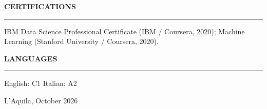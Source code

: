 \documentclass[10pt,a4paper]{article}
\newcommand{\cvsec}[1]{%
  \needspace{5\baselineskip}%
  \vspace{3pt}
  {\color{accent}\bfseries\uppercase{#1}}\\[-3pt]
  {\color{accent}\rule{\linewidth}{0.5pt}}%
  \vspace{4pt}%
}
\begin{document}
\cvsec{Certifications}

\noindent IBM Data Science Professional Certificate (IBM / Coursera, 2020); Machine Learning (Stanford University / Coursera, 2020).

\cvsec{Languages}

\noindent English: C1 \quad\textbar\quad Italian: A2

\vfill
{\small\color{black!50}
L'Aquila, October 2026}
\end{document}
